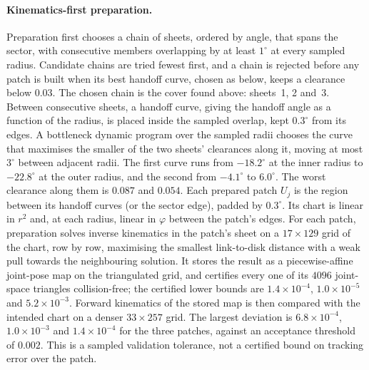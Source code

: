 \paragraph{Kinematics-first preparation.}
Preparation first chooses a chain of sheets, ordered by angle, that spans the sector, with consecutive members overlapping by at least $1^\circ$ at every sampled radius. Candidate chains are tried fewest first, and a chain is rejected before any patch is built when its best handoff curve, chosen as below, keeps a clearance below $0.03$. The chosen chain is the cover found above: sheets~1, 2 and~3. Between consecutive sheets, a handoff curve, giving the handoff angle as a function of the radius, is placed inside the sampled overlap, kept $0.3^\circ$ from its edges. A bottleneck dynamic program over the sampled radii chooses the curve that maximises the smaller of the two sheets' clearances along it, moving at most $3^\circ$ between adjacent radii. The first curve runs from $-18.2^\circ$ at the inner radius to $-22.8^\circ$ at the outer radius, and the second from $-4.1^\circ$ to $6.0^\circ$. The worst clearance along them is $0.087$ and $0.054$. Each prepared patch $U_j$ is the region between its handoff curves (or the sector edge), padded by $0.3^\circ$. Its chart is linear in $r^2$ and, at each radius, linear in $\varphi$ between the patch's edges. For each patch, preparation solves inverse kinematics in the patch's sheet on a $17\times129$ grid of the chart, row by row, maximising the smallest link-to-disk distance with a weak pull towards the neighbouring solution. It stores the result as a piecewise-affine joint-pose map on the triangulated grid, and certifies every one of its $4096$ joint-space triangles collision-free; the certified lower bounds are $1.4\times10^{-4}$, $1.0\times10^{-5}$ and $5.2\times10^{-3}$. Forward kinematics of the stored map is then compared with the intended chart on a denser $33\times257$ grid. The largest deviation is $6.8\times10^{-4}$, $1.0\times10^{-3}$ and $1.4\times10^{-4}$ for the three patches, against an acceptance threshold of $0.002$. This is a sampled validation tolerance, not a certified bound on tracking error over the patch.

